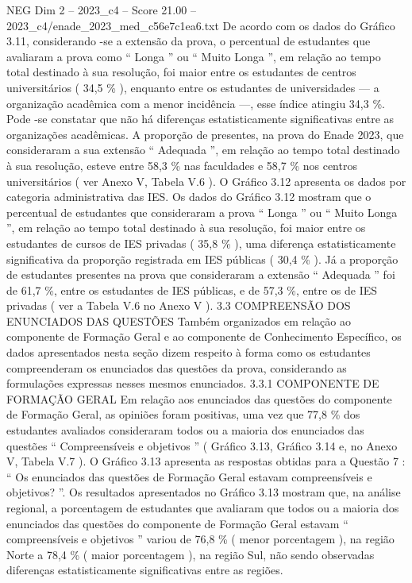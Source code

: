 \begin{textsample}{NEG Dim 2 – 2023\_c4 – Score 21.00 – 2023\_c4/enade\_2023\_med\_c56e7c1ea6.txt}
De acordo com os dados do Gráfico 3.11, considerando -se a extensão da prova, o percentual de estudantes que avaliaram a prova como “ Longa ” ou “ Muito Longa ”, em relação ao tempo total destinado à sua resolução, foi maior entre os estudantes de centros universitários ( 34,5 \% ), enquanto entre os estudantes de universidades — a organização acadêmica com a menor incidência —, esse índice atingiu 34,3 \%.
Pode -se constatar que não há diferenças estatisticamente significativas entre as organizações acadêmicas.
A proporção de presentes, na prova do Enade 2023, que consideraram a sua extensão “ Adequada ”, em relação ao tempo total destinado à sua resolução, esteve entre 58,3 \% nas faculdades e 58,7 \% nos centros universitários ( ver Anexo V, Tabela V.6 ).
O Gráfico 3.12 apresenta os dados por categoria administrativa das IES.
Os dados do Gráfico 3.12 mostram que o percentual de estudantes que consideraram a prova “ Longa ” ou “ Muito Longa ”, em relação ao tempo total destinado à sua resolução, foi maior entre os estudantes de cursos de IES privadas ( 35,8 \% ), uma diferença estatisticamente significativa da proporção registrada em IES públicas ( 30,4 \% ).
Já a proporção de estudantes presentes na prova que consideraram a extensão “ Adequada ” foi de 61,7 \%, entre os estudantes de IES públicas, e de 57,3 \%, entre os de IES privadas ( ver a Tabela V.6 no Anexo V ). 3.3 COMPREENSÃO DOS ENUNCIADOS DAS QUESTÕES Também organizados em relação ao componente de Formação Geral e ao componente de Conhecimento Específico, os dados apresentados nesta seção dizem respeito à forma como os estudantes compreenderam os enunciados das questões da prova, considerando as formulações expressas nesses mesmos enunciados. 3.3.1 COMPONENTE DE FORMAÇÃO GERAL Em relação aos enunciados das questões do componente de Formação Geral, as opiniões foram positivas, uma vez que 77,8 \% dos estudantes avaliados consideraram todos ou a maioria dos enunciados das questões “ Compreensíveis e objetivos ” ( Gráfico 3.13, Gráfico 3.14 e, no Anexo V, Tabela V.7 ).
O Gráfico 3.13 apresenta as respostas obtidas para a Questão 7 : “ Os enunciados das questões de Formação Geral estavam compreensíveis e objetivos? ”.
Os resultados apresentados no Gráfico 3.13 mostram que, na análise regional, a porcentagem de estudantes que avaliaram que todos ou a maioria dos enunciados das questões do componente de Formação Geral estavam “ compreensíveis e objetivos ” variou de 76,8 \% ( menor porcentagem ), na região Norte a 78,4 \% ( maior porcentagem ), na região Sul, não sendo observadas diferenças estatisticamente significativas entre as regiões.

\end{textsample}
